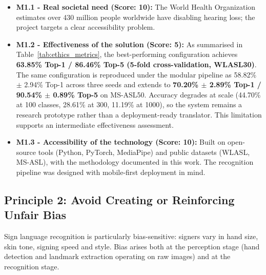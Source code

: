 \begin{itemize}
    \item \textbf{M1.1 - Real societal need (Score: 10):} The World Health Organization estimates over 430 million people worldwide have disabling hearing loss; the project targets a clear accessibility problem.
    \item \textbf{M1.2 - Effectiveness of the solution (Score: 5):} As summarised in Table~\ref{tab:ethics_metrics}, the best-performing configuration achieves \textbf{63.85\% Top-1 / 86.46\% Top-5 (5-fold cross-validation, WLASL30)}. The same configuration is reproduced under the modular pipeline as 58.82\% $\pm$ 2.94\% Top-1 across three seeds and extends to \textbf{70.20\% $\pm$ 2.89\% Top-1 / 90.54\% $\pm$ 0.89\% Top-5} on MS-ASL50. Accuracy degrades at scale (44.70\% at 100 classes, 28.61\% at 300, 11.19\% at 1000), so the system remains a research prototype rather than a deployment-ready translator. This limitation supports an intermediate effectiveness assessment.
    \item \textbf{M1.3 - Accessibility of the technology (Score: 10):} Built on open-source tools (Python, PyTorch, MediaPipe) and public datasets (WLASL, MS-ASL), with the methodology documented in this work. The recognition pipeline was designed with mobile-first deployment in mind.
\end{itemize}

\subsection{Principle 2: Avoid Creating or Reinforcing Unfair Bias}

Sign language recognition is particularly bias-sensitive: signers vary in hand size, skin tone,
signing speed and style. Bias arises both at the perception stage (hand detection and landmark
extraction operating on raw images) and at the recognition stage.

